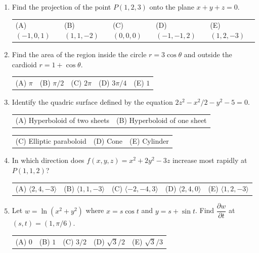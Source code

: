 \documentclass[a4paper, 12pt]{article}
\begin{document}
\begin{enumerate}[leftmargin=*,label=\textbf{\arabic*.}]
\item Find the projection of the point $P(1,2,3)$ onto the plane $x+y+z=0$.
\begin{center}
\begin{tabular}{lllll}
(A) $(-1,0,1)$ &
(B) $(1,1,-2)$ &
(C) $(0,0,0)$ &
(D) $(-1,-1,2)$ &
(E) $(1,2,-3)$
\end{tabular}
\end{center}

\item Find the area of the region inside the circle $r=3\cos\theta$ and outside the cardioid $r=1+\cos\theta$.
\begin{center}
\begin{tabular}{lllll}
(A) $\pi$ &
(B) $\pi/2$ &
(C) $2\pi$ &
(D) $3\pi/4$ &
(E) $1$
\end{tabular}
\end{center}

\item Identify the quadric surface defined by the equation $2z^2 - x^2/2 - y^2 - 5 = 0$.
\begin{center}
\begin{tabular}{ll}
(A) Hyperboloid of two sheets &
(B) Hyperboloid of one sheet 
\end{tabular}

\begin{tabular}{lll}
(C) Elliptic paraboloid &
(D) Cone &
(E) Cylinder
\end{tabular}
\end{center}

\item In which direction does $f(x,y,z) = x^2 + 2y^2 - 3z$ increase most rapidly at $P(1,1,2)$?
\begin{center}
\begin{tabular}{lllll}
(A) $\langle 2, 4, -3 \rangle$ &
(B) $\langle 1, 1, -3 \rangle$ &
(C) $\langle -2, -4, 3 \rangle$ &
(D) $\langle 2, 4, 0 \rangle$ &
(E) $\langle 1, 2, -3 \rangle$
\end{tabular}
\end{center}

\item Let $w = \ln(x^2 + y^2)$ where $x = s\cos t$ and $y = s + \sin t$. Find $\dfrac{\partial w}{\partial t}$ at $(s,t) = (1, \pi/6)$.
\begin{center}
\begin{tabular}{lllll}
(A) $0$ &
(B) $1$ &
(C) $3/2$ &
(D) $\sqrt{3}/2$ &
(E) $\sqrt{3}/3$ 
\end{tabular}
\end{center}


\end{enumerate}
\end{document}
